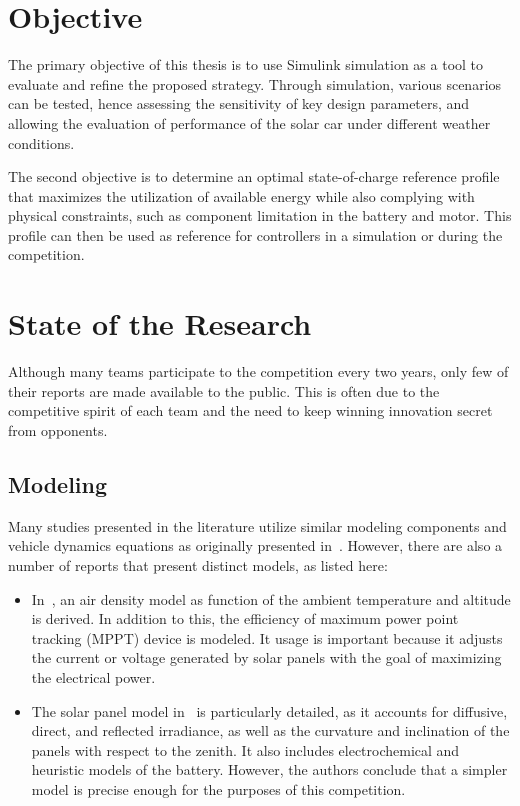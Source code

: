  

\section{Objective}
The primary objective of this thesis is to use Simulink simulation as a tool to evaluate and refine the proposed strategy. Through simulation, various scenarios can be tested, hence assessing the sensitivity of key design parameters, and allowing the evaluation of performance of the solar car under different weather conditions.

The second objective is to determine an optimal state-of-charge reference profile that maximizes the utilization of available energy while also complying with physical constraints, such as component limitation in the battery and motor. This profile can then be used as reference for controllers in a simulation or during the competition.


\section{State of the Research}
Although many teams participate to the competition every two years, only few of their reports are made available to the public. This is often due to the competitive spirit of each team and the need to keep winning innovation secret from opponents.


\subsection{Modeling}
Many studies presented in the literature utilize similar modeling components and vehicle dynamics equations as originally presented in~\cite{winningSolarCar2003book}. However, there are also a number of reports that present distinct models, as listed here:
\begin{itemize}
	\item In~\cite{SolUTra:2006mt}, an air density model as function of the ambient temperature and altitude is derived. In addition to this, the efficiency of maximum power point tracking (MPPT) device is modeled. It usage is important because it adjusts the current or voltage generated by solar panels with the goal of maximizing the electrical power.
	\item The solar panel model in~\cite{optimalEnergyManagement:2000book} is particularly detailed, as it accounts for diffusive, direct, and reflected irradiance, as well as the curvature and inclination of the panels with respect to the zenith. It also includes electrochemical and heuristic models of the battery. However, the authors conclude that a simpler model is precise enough for the purposes of this competition.
\end{itemize}



